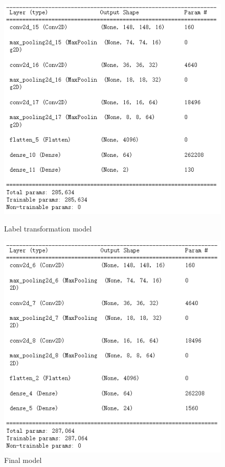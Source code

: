 \documentclass{article}
\begin{document}
\begin{figure}[!h]
	\centering
	\begin{minipage}[t]{0.3\textwidth}%
		\centering
		\includegraphics[width=\textwidth]{label_trans.png}
		\caption{Label transformation model}
		\label{fig:labeltrans}
	\end{minipage}
	\begin{minipage}[t]{0.3\textwidth}%
		\centering
		\includegraphics[width=\textwidth]{classification.png}
		\caption{Final model}
		\label{fig:final}
	\end{minipage}
\end{figure}
\end{document}
